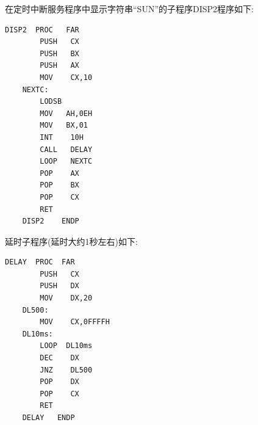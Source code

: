 \documentclass[11pt]{SEU-Digital-Report}
\begin{document}
在定时中断服务程序中显示字符串“SUN”的子程序DISP2程序如下:
\begin{lstlisting}[language={[x86masm]Assembler},title=code]
    DISP2  PROC   FAR
        PUSH   CX    
        PUSH   BX
        PUSH   AX
        MOV    CX,10
    NEXTC: 
        LODSB
        MOV   AH,0EH
        MOV   BX,01
        INT    10H
        CALL   DELAY
        LOOP   NEXTC
        POP    AX
        POP    BX
        POP    CX
        RET
    DISP2    ENDP
\end{lstlisting}

延时子程序(延时大约1秒左右)如下:
\begin{lstlisting}[language={[x86masm]Assembler},title=code]
    DELAY  PROC  FAR
        PUSH   CX
        PUSH   DX
        MOV    DX,20
    DL500:
        MOV    CX,0FFFFH
    DL10ms:
        LOOP  DL10ms
        DEC    DX
        JNZ    DL500
        POP    DX
        POP    CX
        RET
    DELAY   ENDP
\end{lstlisting}
\end{document}
